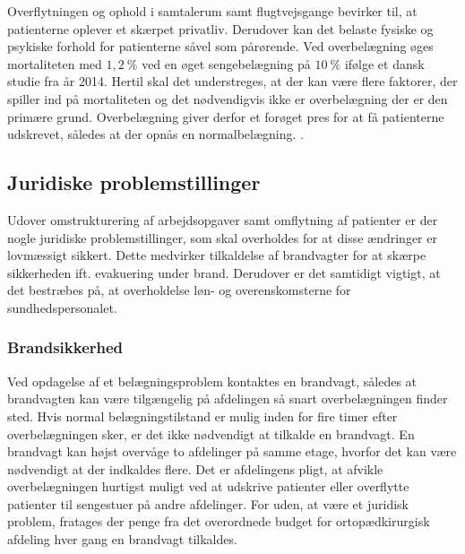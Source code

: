 \noindet
Overflytningen og ophold i samtalerum samt flugtvejsgange bevirker til, at patienterne oplever et skærpet privatliv. \cite{Madsen2014} Derudover kan det belaste fysiske og psykiske forhold for patienterne såvel som pårørende. \cite{Heidmann2014} Ved overbelægning øges mortaliteten med $1,2~\%$ ved en øget sengebelægning på $10~\%$ ifølge et dansk studie fra år 2014. \cite{Madsen2014} Hertil skal det understreges, at der kan være flere faktorer, der spiller ind på mortaliteten og det nødvendigvis ikke er overbelægning der er den primære grund. Overbelægning giver derfor et forøget pres for at få patienterne udskrevet, således at der opnås en normalbelægning. .


\subsection{Juridiske problemstillinger}
Udover omstrukturering af arbejdsopgaver samt omflytning af patienter er der nogle juridiske problemstillinger, som skal overholdes for at disse ændringer er lovmæssigt sikkert. Dette medvirker tilkaldelse af brandvagter for at skærpe sikkerheden ift. evakuering under brand. Derudover er det samtidigt vigtigt, at det bestræbes på, at overholdelse løn- og overenskomsterne for sundhedspersonalet.

\subsubsection{Brandsikkerhed}
Ved opdagelse af et belægningsproblem kontaktes en brandvagt, således at brandvagten kan være tilgængelig på afdelingen så snart overbelægningen finder sted. Hvis normal belægningstilstand er mulig inden for fire timer efter overbelægningen sker, er det ikke nødvendigt at tilkalde en brandvagt. En brandvagt kan højst overvåge to afdelinger på samme etage, hvorfor det kan være nødvendigt at der indkaldes flere. Det er afdelingens pligt, at  afvikle overbelægningen hurtigst muligt ved at udskrive patienter eller overflytte patienter til sengestuer på andre afdelinger. \cite{Beredskab2016} For uden, at være et juridisk problem, fratages der penge fra det overordnede budget for ortopædkirurgisk afdeling hver gang en brandvagt tilkaldes.  

